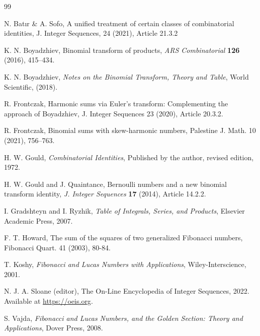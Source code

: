 \documentclass[12pt,reqno]{article}
\begin{document}
	\begin{thebibliography}{99}
		
		N. Bat\i r \& A. Sofo, A unified treatment of certain classes of combinatorial identities, J. Integer Sequences, 24 (2021), Article 21.3.2
		
		K. N. Boyadzhiev, Binomial transform of products, \emph{ARS Combinatorial} {\bf 126} (2016), 415--434.
		
		K. N. Boyadzhiev, \emph{ Notes on the Binomial Transform, Theory and Table}, World Scientific, (2018).
		
		R. Frontczak, Harmonic sums via Euler's transform: Complementing the approach of Boyadzhiev, J. Integer Sequences 23 (2020), Article 20.3.2.
		
		R. Frontczak, Binomial sums with skew-harmonic numbers, Palestine J. Math. 10 (2021), 756--763.
		
		H. W. Gould, \emph{Combinatorial Identities}, Published by the author, revised edition, 1972.
		
		H. W. Gould and J. Quaintance, Bernoulli numbers and a new binomial transform identity, \emph{J. Integer Sequences} {\bf 17} (2014), Article 14.2.2.
		
		I. Gradshteyn and I. Ryzhik, \emph{Table of Integrals, Series, and Products}, Elsevier Academic Press, 2007.
		
		F. T. Howard, The sum of the squares of two generalized Fibonacci numbers, Fibonacci Quart. 41 (2003), 80-84.
		
		T. Koshy, \emph{Fibonacci and Lucas Numbers with Applications}, Wiley-Interscience, 2001.
		
		N. J. A. Sloane (editor), The On-Line Encyclopedia of Integer Sequences, 2022. Available at \url{https://oeis.org}.
		
		S. Vajda, \emph{Fibonacci and Lucas Numbers, and the Golden Section: Theory and Applications}, Dover Press, 2008.
		
	\end{thebibliography}
	
\end{document}
